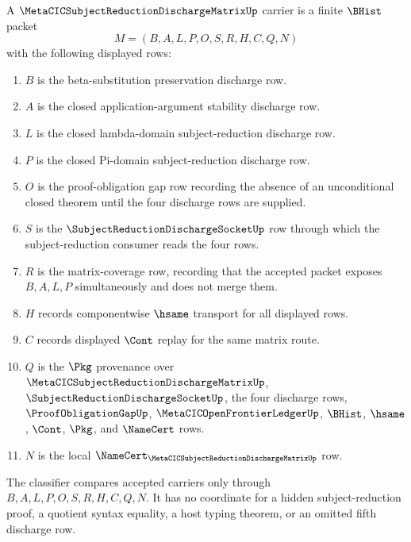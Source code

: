 \begin{definition}
\label{def:metacic-subject-reduction-discharge-matrix-carrier}
A $\MetaCICSubjectReductionDischargeMatrixUp$ carrier is a finite $\BHist$ packet
$$
M=(B,A,L,P,O,S,R,H,C,Q,N)
$$
with the following displayed rows:
\begin{enumerate}
\item $B$ is the beta-substitution preservation discharge row.
\item $A$ is the closed application-argument stability discharge row.
\item $L$ is the closed lambda-domain subject-reduction discharge row.
\item $P$ is the closed Pi-domain subject-reduction discharge row.
\item $O$ is the proof-obligation gap row recording the absence of an unconditional closed theorem until the four discharge rows are supplied.
\item $S$ is the $\SubjectReductionDischargeSocketUp$ row through which the subject-reduction consumer reads the four rows.
\item $R$ is the matrix-coverage row, recording that the accepted packet exposes $B,A,L,P$ simultaneously and does not merge them.
\item $H$ records componentwise $\hsame$ transport for all displayed rows.
\item $C$ records displayed $\Cont$ replay for the same matrix route.
\item $Q$ is the $\Pkg$ provenance over $\MetaCICSubjectReductionDischargeMatrixUp$, $\SubjectReductionDischargeSocketUp$, the four discharge rows, $\ProofObligationGapUp$, $\MetaCICOpenFrontierLedgerUp$, $\BHist$, $\hsame$, $\Cont$, $\Pkg$, and $\NameCert$ rows.
\item $N$ is the local $\NameCert_{\MetaCICSubjectReductionDischargeMatrixUp}$ row.
\end{enumerate}
The classifier compares accepted carriers only through $B,A,L,P,O,S,R,H,C,Q,N$. It has no coordinate for a hidden subject-reduction proof, a quotient syntax equality, a host typing theorem, or an omitted fifth discharge row.
\end{definition}

